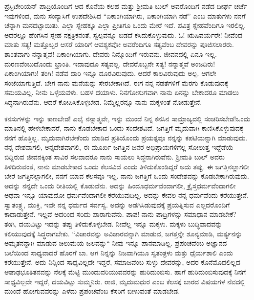 \newpage

ಪ್ರೆಸ್ಬಿಟೇರಿಯನ್ ಪಾದ್ರಿಯೊಂದಿಗೆ ಆದ ಕೊನೆಯ ಕಲಹ ಮತ್ತು ಶ‍್ರೀಮತಿ ಬುಲ್ ಅವರೊಂದಿಗೆ ನಡೆದ ದೀರ್ಘ ಚರ್ಚೆ ಇವುಗಳಿಂದ, ಮನು ಸಂನ್ಯಾಸಿಗೆ ಉಪದೇಶಿಸಿದ “ಏಕಾಂಗಿಯಾಗಿರು, ಏಕಾಂಗಿಯಾಗಿ ನಡೆ” ಎಂಬ ಮಾತುಗಳು ನನಗೆ ಚೆನ್ನಾಗಿ ಮನದಟ್ಟಾಯಿತು. ಎಲ್ಲಾ ಸ್ನೇಹಕ್ಕೂ ಎಲ್ಲಾ ಪ್ರೀತಿಗೂ ಒಂದು ಮೇರೆ ಇದೆ. ಪವಿತ್ರ ಸ್ನೇಹವೆಂದಿಗೂ ಇರಲಿಲ್ಲ. ಅದರಲ್ಲೂ ಹೆಂಗಸಿನ ಸ್ನೇಹ ನಕ್ಷತ್ರಿಕನಂತೆ, ಸ್ವಲ್ಪವನ್ನೂ ಬಿಡದೆ ಕಸಿದುಕೊಳ್ಳುವುದು. ಓ! ಋಷಿವರ್ಯರೇ! ನೀವೆಂದ ಮಾತು ಸತ್ಯ! ಮತ್ತೊಬ್ಬರ ಆಸರೆ ಯಾರಿಗೆ ಆವಶ್ಯಕವೋ ಅವರೆಂದಿಗೂ ಸತ್ಯವೆಂಬ ದೇವರನ್ನು ಪೂಜಿಸಲಾರರು. ಶಾಂತವಾಗು ನನ್ನಾತ್ಮವೆ! ಏಕಾಂಗಿಯಾಗು. ದೇವರು ನಿನ್ನೊಂದಿಗೆ ಇರುವನು. ಜೀವನದಲ್ಲಿ ಏನೂ ಇಲ್ಲ. ಮರಣವೆಂಬುದೊಂದು ಭ್ರಾಂತಿ. ಇದಾವುದೂ ಸತ್ಯವಲ್ಲ. ದೇವರೊಬ್ಬನೇ ಸತ್ಯ! ನನ್ನಾತ್ಮವೆ ಅಂಜದಿರು! ಏಕಾಂಗಿಯಾಗು! ತಂಗಿ! ನಡೆವ ದಾರಿ ಇನ್ನೂ ದೂರವಿರುವುದು. ಆದರೆ ಕಾಲವಿರುವುದು ಅಲ್ಪ. ಆಗಲೇ ಸಂಜೆಯಾಗುತ್ತಿದೆ. ಬೇಗ ನಾನು ಮನೆಯನ್ನು ಸೇರಬೇಕಾಗಿದೆ. ಈಗ ನನ್ನ ನಡತೆಗಳಿಗೆ ಮೆರಗು ಕೊಡುವುದಕ್ಕೆ ಸಮಯವಿಲ್ಲ. ನೀನು ಒಳ್ಳೆಯವಳು. ಬಹಳ ದಯಾಳು. ನಿನಗೋಸುಗವಾಗಿ ನಾನು ಏನನ್ನು ಬೇಕಾದರೂ ಮಾಡಲು ಸಿದ್ಧನಾಗಿರುವೆನು. ಆದರೆ ಕೋಪಿಸಿಕೊಳ್ಳಬೇಡ. ನಿಮ್ಮೆಲ್ಲರನ್ನೂ ನಾನು ಮಕ್ಕಳಂತೆ ನೋಡುತ್ತೇನೆ.

ಕನಸುಗಳನ್ನು ಇನ್ನು ಕಾಣಬೇಡ! ಎಲೈ ನನ್ನಾತ್ಮವೇ, ಇನ್ನು ಮುಂದೆ ನಿನ್ನ ಕನಸಿನ ಸಾಮ್ರಾಜ್ಯದಲ್ಲಿ ಸಂಚರಿಸಬೇಡ!ಒಂದು ಮಾತಿನಲ್ಲಿ ಹೇಳಬೇಕಾದರೆ, ನಾನು ಕೊಡಬೇಕಾದ ಒಂದು ಸಂದೇಶವಿದೆ. ಜಗತ್ತಿಗೆ ಮೃದುವಾಗಿ ಕಾಣಿಸಿಕೊಳ್ಳುವುದಕ್ಕೆ ನನಗೆ ಹೊತ್ತಿಲ್ಲ. ಮೃದುವಾಗಿರಬೇಕೆಂದು ಮಾಡಿದ ಪ್ರತಿಯೊಂದು ಪ್ರಯತ್ನವೂ ನನ್ನನ್ನು ಕಪಟಿಯನ್ನಾಗಿ ಮಾಡುವುದು. ನನ್ನ ದೇಶವಾಗಲಿ, ಅನ್ಯದೇಶವಾಗಲಿ, ಈ ಮೂರ್ಖ ಜಗತ್ತಿನ ಜನರ ಅಭಿಪ್ರಾಯಗಳಿಗೆಲ್ಲ ಸೋಲುತ್ತ ಇದ್ದೆಡೆಯೆ ಬಿದ್ದಿರುವ ಜೀವನಕ್ಕಿಂತ ಸಾವಿರ ಸಲವಾದರೂ ನಾನು ಸಾಯಲು ಸಿದ್ಧನಾಗಿರುವೆನು. ಶ‍್ರೀಮತಿ ಬುಲ್ ಅವರು ತಿಳಿದಿರುವಂತೆ, ನಾನು ಮಾಡಬೇಕಾದ ಒಂದು ಕೆಲಸವಿದೆ ಎಂದು ತಿಳಿದುಕೊಂಡಿದ್ದರೆ ಅದು ತಪ್ಪು. ಈ ಜಗತ್ತಿನಲ್ಲಾಗಲೀ ಬೇರೆ ಜಗತ್ತಿನಲ್ಲಾಗಲೀ, ನನಗೆ ಯಾವ ಕೆಲಸವೂ ಇಲ್ಲ. ನಾನು ಜಗತ್ತಿಗೆ ಒಂದು ಸಂದೇಶವನ್ನು ಕೊಡಬೇಕಾಗಿರುವುದು. ಅದನ್ನು ನನ್ನದೇ ಒಂದು ರೀತಿಯಲ್ಲಿ ಕೊಡುವೆನು. ಅದನ್ನು ಹಿಂದೂಧರ್ಮವೆಂದಾಗಲೀ, ಕ್ರೈಸ್ತಧರ್ಮವೆಂದಾಗಲೀ ಅಥವಾ ಇನ್ನೂ ಯಾವುದೋ ಧರ್ಮವೆಂದಾಗಲೀ ಕರೆಯುವುದಿಲ್ಲ. ಅದನ್ನು ಕೇವಲ ನನ್ನ ಧರ್ಮವೆಂದು ಕರೆಯುತ್ತೇನೆ. ಸ್ವಾತಂತ್ರ್ಯ, ಮುಕ್ತಿ, ಇವೇ ನನ್ನ ಧರ್ಮದ ಸರ್ವಸ್ವ. ಅದನ್ನು ಅಡಗಿಸಿಡುವುದಕ್ಕೆ ಪ್ರಯತ್ನಿಸುವ ಎಲ್ಲದರೊಂದಿಗೆ ಕಾದಾಡುತ್ತೇನೆ. ಇಲ್ಲವೆ ಅದರಿಂದ ಸರಿದು ಪಾರಾಗುವೆನು. ಪಾಪ! ನಾನು ಪಾದ್ರಿಗಳನ್ನು ಸಮಾಧಾನ ಮಾಡಬೇಕೆ? ತಂಗಿ, ದಯವಿಟ್ಟು ಇದನ್ನು ತಪ್ಪು ತಿಳಿದುಕೊಳ್ಳಬೇಡ. ನೀವೆಲ್ಲ ಇನ್ನೂ ಮಕ್ಕಳು. ಮಕ್ಕಳು ಬುದ್ಧಿವಾದವನ್ನು ಕಲಿಯುವುದಕ್ಕೆ ಸಿದ್ಧರಾಗಬೇಕು. “ವಿಚಾರವನ್ನು ಅವಿಚಾರವನ್ನಾಗಿ ಮಾಡುವ, ಜಗತ್ತನ್ನೇ ಶೂನ್ಯಮಾಡಿ, ಮರ್ತ್ಯನನ್ನು ಅಮೃತನನ್ನಾಗಿ ಮಾಡುವ ಚಿಲುಮೆಯ ಜಲವನ್ನು“ ನೀವು ಇನ್ನೂ ಪಾನಮಾಡಿಲ್ಲ. ಪ್ರಪಂಚವೆಂಬ ಅಜ್ಞಾನದ ಬಲೆಯಿಂದ ಸಾಧ್ಯವಾದರೆ ಹೊರಗೆ ಬಾ. ಆಗ ನಿನ್ನನ್ನು ನಿಜವಾಗಿಯೂ ಸ್ವತಂತ್ರಳು ಮತ್ತು ಧೈರ್ಯಶಾಲಿ ಎಂದು ಕರೆಯುತ್ತೇನೆ. ಅದು ನಿನ್ನಿಂದ ಸಾಧ್ಯವಿಲ್ಲದೇ ಇದ್ದರೆ, ಸಮಾಜವೆಂಬ ಸುಳ್ಳು ದೇವರನ್ನು, ಅದರ ಕೊನೆಮೊದಲಿಲ್ಲದ ಆಷಾಢಭೂತಿತನವನ್ನು ನೆಲಕ್ಕೆ ಮೆಟ್ಟಿ ಮುಂದುವರಿಯುವವರನ್ನು ಹುರಿದುಂಬಿಸು. ಹಾಗೆ ಹುರಿದುಂಬಿಸುವುದಕ್ಕೆ ನಿನಗೆ ಸಾಧ್ಯವಿಲ್ಲದೇ ಇದ್ದರೆ, ದಯವಿಟ್ಟು ಸುಮ್ಮನಿರು. ರಾಜಿ, ಮೃದುಮಧುರ ಎಂಬ ಕೆಲಸಕ್ಕೆ ಬಾರದ ವಿಷಯಗಳ ನೆವದಲ್ಲಿ ಮುಂದೆ ಹೋಗುವವರನ್ನು ಎಳೆದು ಪ್ರಪಂಚವೆಂಬ ಕೆಸರಿಗೆ ಬೀಳುವಂತೆ ಮಾಡಬೇಡ.
\vspace{0.2cm}

